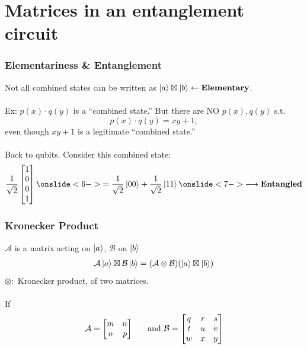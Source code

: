 \documentclass{beamer}
\theoremstyle{definition}
\newcommand{\A}{\mathcal{A}}
\newcommand{\B}{\mathcal{B}}
\begin{document}
\section{Matrices in an entanglement circuit}

\begin{frame}
\frametitle{Elementariness \& Entanglement}
\pause
Not all combined states can be written as $ \left\vert{a}\right\rangle\boxtimes \left\vert{b}\right\rangle \leftarrow \textbf{Elementary}$.\\
$\,$\\
\pause
Ex: $p(x)\cdot q(y)$ is a ``combined state.'' But there are NO $p(x), q(y)$ s.t. $$p(x)\cdot q(y) = xy + 1,$$ even though $xy + 1$ is a legitimate ``combined state.''\\
\pause
$\,$\\
Back to qubits. Consider this combined state:\pause
\begin{align*}
\frac{1}{\sqrt{2}}\begin{bmatrix}
1\\0\\0\\1
\end{bmatrix} \onslide<6->{= \frac{1}{\sqrt{2}}\ket{00} + \frac{1}{\sqrt{2}}\ket{11} \onslide<7->{ \longrightarrow \textbf{Entangled}}}
\end{align*}

\end{frame}


\begin{frame}
\frametitle{Kronecker Product}
\pause
$\A$ is a matrix acting on $\left\vert{a}\right\rangle$, $\B$ on $\left\vert{b}\right\rangle$ 
\pause
\begin{align*}
\A\ket{a} \boxtimes \mathcal{B}\ket{b} = (\A \otimes \mathcal{B})(\ket{a} \boxtimes \ket{b})
\end{align*}
\pause
$\otimes:$ Kronecker product, of two matrices. \\
\pause
$\,$\\
If
\begin{align*}
\A = \begin{bmatrix}
m & n \\ o & p
\end{bmatrix}
\hspace{0.5cm}\text{ and }
\mathcal{B} = \begin{bmatrix}
q & r & s \\ t & u & v \\ w & x & y
\end{bmatrix}
\end{align*} 

\end{frame}
\end{document}
